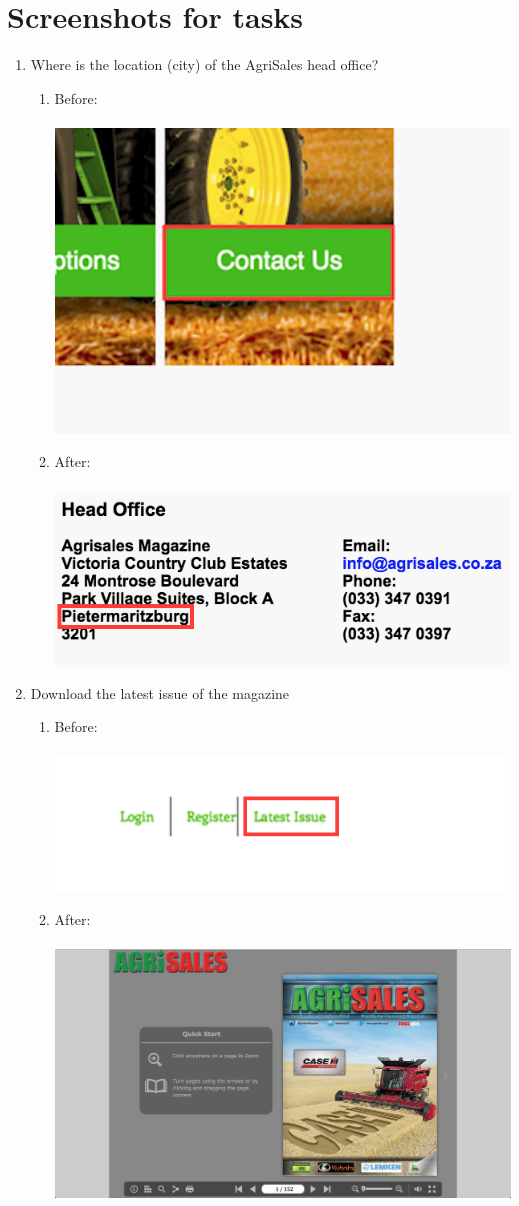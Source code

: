 \documentclass[11pt]{article}
\begin{document}
\section{Screenshots for tasks}
	\begin{enumerate}
		
		\item Where is the location (city) of the AgriSales head office?
				\begin{enumerate}
					\item Before: \\ \\
						\includegraphics[width=0.3\linewidth]{../Images/Tasks/Task1Before}
					\item After: \\ \\
						\includegraphics[width=0.5\linewidth]{../Images/Tasks/Task1After}
				\end{enumerate}
				
		\item Download the latest issue of the magazine
			\begin{enumerate}
				\item Before: \\ \\
					\includegraphics[width=0.7\linewidth]{../Images/Tasks/Task2Before}
				\item After: \\ \\
					\includegraphics[width=0.5\linewidth]{../Images/Tasks/Task2After}
			\end{enumerate}


\end{enumerate}
\end{document}
